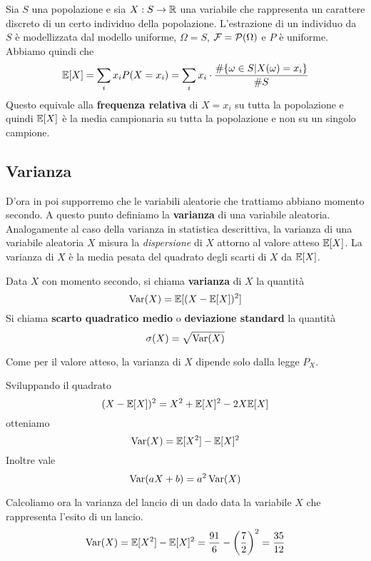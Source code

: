 \begin{example}
	Sia $S$ una popolazione e sia $X : S \to \mathbb{R}$ una variabile che rappresenta un carattere
	discreto di un certo individuo della popolazione. L'estrazione di un individuo da $S$ è
	modellizzata dal modello uniforme, $\Omega = S$, $\mathcal{F} = \mathcal{P}(\Omega)$ e $P$ è uniforme.
	Abbiamo quindi che
	\[
		\mathbb{E}[X] = \sum_i x_i P(X = x_i) =
		\sum_i x_i \cdot \frac{\# \{\omega \in S | X(\omega) = x_i\}}{\# S}
	\]
	Questo equivale alla \textbf{frequenza relativa} di $X = x_i$ su tutta la popolazione e quindi
	$\mathbb{E}[X]$ è la media campionaria su tutta la popolazione e non su un singolo campione.
\end{example}

\subsection{Varianza}
D'ora in poi supporremo che le variabili aleatorie che trattiamo abbiano momento secondo. A questo
punto definiamo la \textbf{varianza} di una variabile aleatoria. Analogamente al caso della
varianza in statistica descrittiva, la varianza di una variabile aleatoria $X$ misura la
\emph{dispersione} di $X$ attorno al valore atteso $\mathbb{E}[X]$. La varianza di $X$ è la media pesata
del quadrato degli scarti di $X$ da $\mathbb{E}[X]$.

\begin{definition}
	Data $X$ con momento secondo, si chiama \textbf{varianza} di $X$ la quantità
	\[ \operatorname{Var}(X) = \mathbb{E}[(X - \mathbb{E}[X])^2] \]
	Si chiama \textbf{scarto quadratico medio} o \textbf{deviazione standard} la quantità
	\[ \sigma(X) = \sqrt{\operatorname{Var}(X)} \]
\end{definition}

\begin{observation}
	Come per il valore atteso, la varianza di $X$ dipende solo dalla legge $P_X$.
\end{observation}

\begin{observation}
	Sviluppando il quadrato
	\[ (X - \mathbb{E}[X])^2 = X^2 + \mathbb{E}[X]^2 - 2 X \mathbb{E}[X] \]
	otteniamo
	\[ \operatorname{Var}(X) = \mathbb{E}[X^2] - \mathbb{E}[X]^2 \]
	Inoltre vale
	\[ \operatorname{Var}(aX + b) = a^2 \operatorname{Var}(X) \]
\end{observation}

\begin{example}
	Calcoliamo ora la varianza del lancio di un dado data la variabile $X$ che rappresenta l'esito
	di un lancio.
	\[ \operatorname{Var}(X) = \mathbb{E}[X^2] - \mathbb{E}[X]^2 = \frac{91}{6} - \left(\frac{7}{2}\right)^2 = \frac{35}{12} \]
\end{example}

